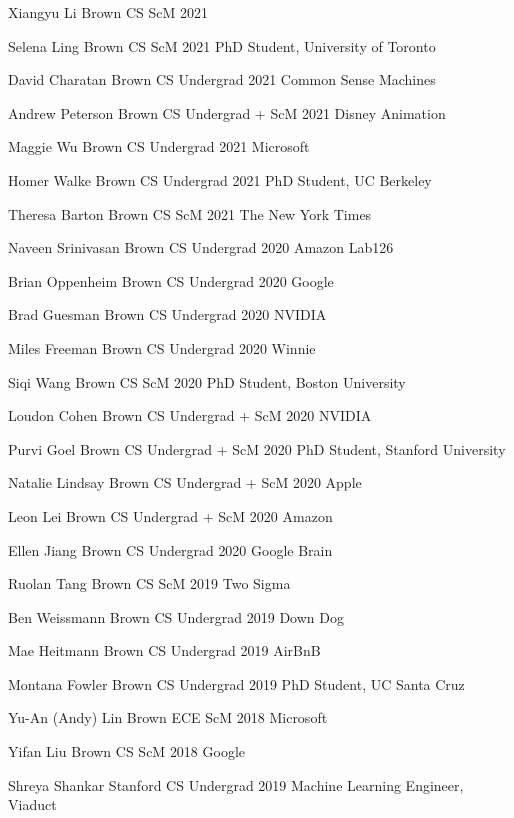 \documentclass[line,margin]{res}
\begin{document}
\begin{resume}
\alumni
{Xiangyu Li}
{Brown CS ScM}
{2021}
{}

\alumni
{Selena Ling}
{Brown CS ScM}
{2021}
{PhD Student, University of Toronto}

\alumni
{David Charatan}
{Brown CS Undergrad}
{2021}
{Common Sense Machines}

\alumni
{Andrew Peterson}
{Brown CS Undergrad + ScM}
{2021}
{Disney Animation}

\alumni
{Maggie Wu}
{Brown CS Undergrad}
{2021}
{Microsoft}

\alumni
{Homer Walke}
{Brown CS Undergrad}
{2021}
{PhD Student, UC Berkeley}

\alumni
{Theresa Barton}
{Brown CS ScM}
{2021}
{The New York Times}

\alumni
{Naveen Srinivasan}
{Brown CS Undergrad}
{2020}
{Amazon Lab126}

\alumni
{Brian Oppenheim}
{Brown CS Undergrad}
{2020}
{Google}

\alumni
{Brad Guesman}
{Brown CS Undergrad}
{2020}
{NVIDIA}

\alumni
{Miles Freeman}
{Brown CS Undergrad}
{2020}
{Winnie}

\alumni
{Siqi Wang}
{Brown CS ScM}
{2020}
{PhD Student, Boston University}

\alumni
{Loudon Cohen}
{Brown CS Undergrad + ScM}
{2020}
{NVIDIA}

\alumni
{Purvi Goel}
{Brown CS Undergrad + ScM}
{2020}
{PhD Student, Stanford University}

\alumni
{Natalie Lindsay}
{Brown CS Undergrad + ScM}
{2020}
{Apple}

\alumni
{Leon Lei}
{Brown CS Undergrad + ScM}
{2020}
{Amazon}

\alumni
{Ellen Jiang}
{Brown CS Undergrad}
{2020}
{Google Brain}

\alumni
{Ruolan Tang}
{Brown CS ScM}
{2019}
{Two Sigma}

\alumni
{Ben Weissmann}
{Brown CS Undergrad}
{2019}
{Down Dog}

\alumni
{Mae Heitmann}
{Brown CS Undergrad}
{2019}
{AirBnB}

\alumni
{Montana Fowler}
{Brown CS Undergrad}
{2019}
{PhD Student, UC Santa Cruz}

\alumni
{Yu-An (Andy) Lin}
{Brown ECE ScM}
{2018}
{Microsoft}

\alumni
{Yifan Liu}
{Brown CS ScM}
{2018}
{Google}

\alumni
{Shreya Shankar}
{Stanford CS Undergrad}
{2019}
{Machine Learning Engineer, Viaduct}


\end{resume}
\end{document}
